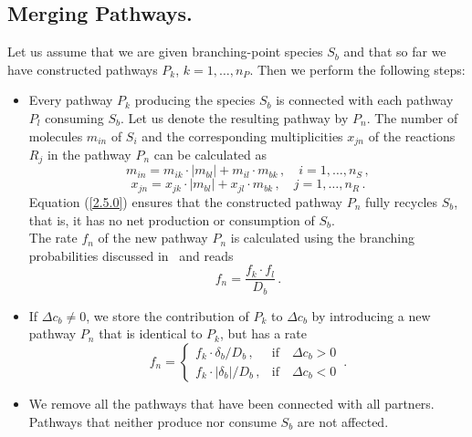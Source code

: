 \subsection{Merging Pathways.}
\label{sec2c3}
Let us assume that we are given branching-point species $S_b$ and that so far we have constructed pathways $P_k$, $k=1,\ldots,n_P$.  Then we perform the following steps:
\begin{itemize}
\item {Every pathway $P_k$ producing the species $S_b$ is connected with each pathway $P_l$ consuming $S_b$. Let us denote the resulting pathway by $P_n$. The number of molecules $m_{in}$ of $S_i$ and the corresponding multiplicities $x_{jn}$ of the reactions $R_j$ in the pathway $P_n$ can be calculated as
\begin{equation}
m_{in} = m_{ik}\cdot|m_{bl}| + m_{il}\cdot m_{bk} \,, \quad i = 1,\ldots, n_S\,,
\label{2.5.0}
\end{equation}
\begin{equation}
x_{jn} = x_{jk}\cdot|m_{bl}| + x_{jl}\cdot m_{bk} \,, \quad j = 1,\ldots, n_R\,.
\label{2.5.1}
\end{equation}
Equation (\ref{2.5.0}) ensures that the constructed pathway $P_n$ fully recycles $S_b$, that is, it has no net production or consumption of $S_b$. 
\\ The rate $f_n$ of the new pathway $P_n$ is calculated using the branching probabilities discussed in~\cite{Lehmann2004/JAC} and reads
\begin{equation}
f_n = \frac{f_k\cdot f_l}{D_b}\,.
\label{2.5.2}
\end{equation}
}
\item {If $\Delta c_b\neq 0$, we store the contribution of $P_k$ to $\Delta c_b$ by introducing a new pathway $P_n$ that is identical to $P_k$, but has a rate
\begin{equation}
f_n = \left\{\begin{array}{cc} f_k\cdot \delta_b / D_b\,, & \mathrm{if}\quad \Delta c_b > 0 \\ f_k\cdot |\delta_b| / D_b\,, & \mathrm{if}\quad \Delta c_b <0 \end{array}\right.\,.
\label{2.5.3}
\end{equation}
}
\item {We remove all the pathways that have been connected with all partners. Pathways that neither produce nor consume $S_b$ are not affected.}
\end{itemize}



